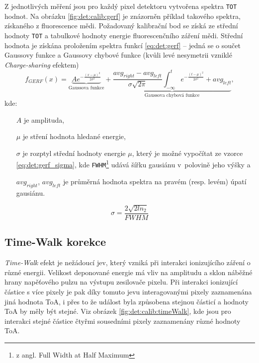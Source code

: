 Z jednotlivých měření jsou pro každý pixel detektoru vytvořena spektra \texttt{TOT} hodnot. Na obrázku \ref{fig:det:calib:gerf} je znázorněn příklad takového spektra, získaného z fluorescence mědi. Požadovaný kalibrační bod se získá ze střední hodnoty \texttt{TOT} a tabulkové hodnoty energie fluorescenčního záření mědi. Střední hodnota je získána proložením spektra funkcí \ref{eq:det:gerf} -- jedná se o součet Gaussovy funkce a Gaussovy chybové funkce (kvůli levé nesymetrii vzniklé \textit{Charge-sharing} efektem)
\begin{equation}\label{eq:det:gerf}
	f_{GERF}(x) = \underbrace{Ae^{ -\frac{(x-\mu)^2}{2\sigma^2} }}_{\text{Gaussova funkce}} +
	\underbrace{ \frac{avg_{right} - avg_{left}}{\sigma\sqrt{2\pi}} \int_{-\infty}^t e^{ -\frac{(t-\mu)^2}{2\sigma^2} } + avg_{left}}_{\text{Gaussova chybová funkce}},
\end{equation}
kde:
\begin{changemargin}{1.5cm}{1cm} 
	\begin{itemize}
		\item [$A$] je amplituda,
		\item [$\mu$] je stření hodnota hledané energie,
		\item [$\sigma$] je rozptyl střední hodnoty energie $\mu$, který je možné vypočítat ze vzorce 
			\ref{eq:det:gerf_sigma}, kde \texttt{FWHM}\footnote{z angl. Full Width at Half Maximum} udává šířku gausiánu v~polovině jeho výšky a
		\item [$avg_{right}$, $avg_{left}$] je průměrná hodnota spektra na pravém (resp. levém) úpatí gausiánu.
	\end{itemize}
\end{changemargin}

\begin{equation}\label{eq:det:gerf_sigma}
	\sigma = \frac{2\sqrt{2ln_2}}{FWHM}
\end{equation}

\subsection{Time-Walk korekce}\label{chap:detectors:calibration:timeWalk}

\textit{Time-Walk} efekt je nežádoucí jev, který vzniká při interakci ionizujícího záření o různé energii. Velikost deponované energie má vliv na amplitudu a sklon náběžné hrany napěťového pulzu na výstupu zesilovače pixelu. Při interakci ionizující částice s více pixely je pak díky tomuto jevu interagovanými pixely zaznamenána jiná hodnota ToA, i přes to že událost byla způsobena stejnou částicí a hodnoty ToA by měly být stejné. Viz obrázek \ref{fig:det:calib:timeWalk}, kde jsou pro interakci stejné částice čtyřmi sousedními pixely zaznamenány různé hodnoty ToA. 

